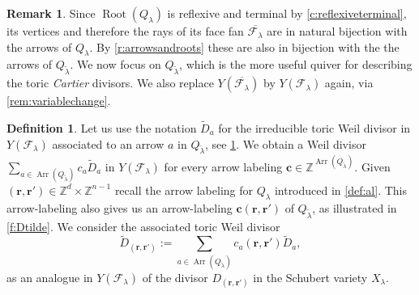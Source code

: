 \documentclass{amsart}
\theoremstyle{definition}
\newtheorem{defn}[thm]{Definition}
\newtheorem{remark}[thm]{Remark}
\numberwithin{equation}{section}
\newcommand{\Arr}{\operatorname{Arr}}
\newcommand{\FF}{\mathcal{F}}
\newcommand{\Root}{\operatorname{Root}}
\newcommand{\Z}{\mathbb{Z}}
\begin{document}
\begin{remark}\label{r:Weil} Since $\Root(Q_{\lambda})$ is reflexive and terminal by \cref{c:reflexiveterminal}, its vertices and therefore the rays of its face fan $\overline{\FF_\lambda}$ are in 
natural bijection with the arrows of $Q_{\lambda}$. By \cref{r:arrowsandroots} these are also in bijection with the the arrows of $Q_{\widetilde{\lambda}}$. We now focus on $Q_{\widetilde \lambda}$, which is the more useful quiver for describing the toric \textit{Cartier} divisors. We also replace  $Y(\overline{\FF_\lambda})$ by $Y(\FF_\lambda)$ again, via \cref{rem:variablechange}.
\end{remark}
\begin{defn}\label{d:Dtilde}
Let us use the notation $\widetilde D_a$ for the irreducible toric Weil divisor in  $Y(\FF_\lambda)$ associated to an arrow $a$ in $Q_{\widetilde\lambda}$, see \cref{r:Weil}. We obtain a Weil divisor $\sum_{a\in \Arr(Q_{\widetilde{\lambda}})} c_a \widetilde D_a$ in $Y(\FF_\lambda)$ 
 for every arrow labeling $\mathbf c\in\Z^{\Arr(Q_{\widetilde \lambda})}$. 
Given $(\mathbf r,\mathbf {r'})\in\Z^{d}\times\Z^{n-1}$ recall the arrow labeling for $Q_\lambda$  introduced in \cref{def:al}. This arrow-labeling also gives us an arrow-labeling $\mathbf c(\mathbf r,\mathbf r')$ of $Q_{\widetilde\lambda}$, as illustrated in \cref{f:Dtilde}. We consider the associated toric Weil divisor 
\begin{equation}\label{e:toricWeil}
\widetilde D_{(\mathbf r,\mathbf r')}:=
\sum_{a\in \Arr(Q_{\widetilde{\lambda}})} c_a(\mathbf r,\mathbf r') \widetilde D_a,
\end{equation}
as an  analogue in 	$Y(\FF_\lambda)$ of the divisor $D_{(\mathbf r,\mathbf r')}$ in the Schubert variety $X_\lambda$.
\end{defn}
 
\end{document}
